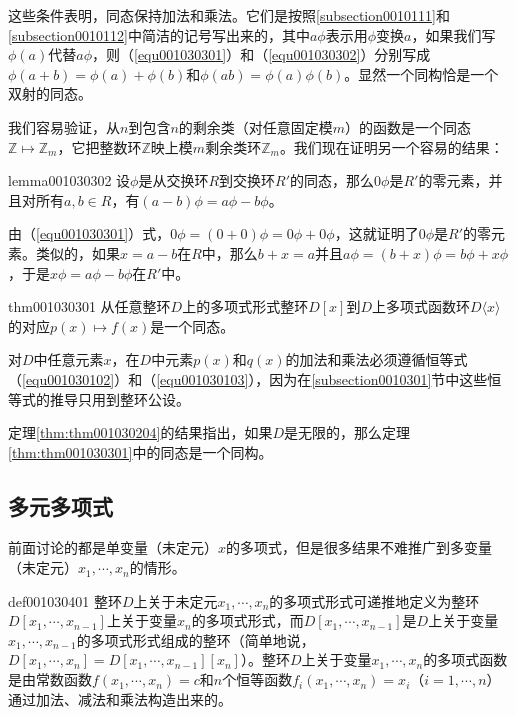 这些条件表明，同态保持加法和乘法。它们是按照\ref{subsection0010111}和\ref{subsection0010112}中简洁的记号写出来的，其中$a\phi$表示用$\phi$变换$a$，如果我们写$\phi(a)$代替$a\phi$，则（\ref{equ001030301}）和（\ref{equ001030302}）分别写成$\phi(a+b)=\phi(a)+\phi(b)$和$\phi(ab)=\phi(a)\phi(b)$。显然一个同构恰是一个双射的同态。

我们容易验证，从$n$到包含$n$的剩余类（对任意固定模$m$）的函数是一个同态$\mathbb{Z}\mapsto \mathbb{Z}_m$，它把整数环$\mathbb{Z}$映上模$m$剩余类环$\mathbb{Z}_m$。我们现在证明另一个容易的结果：
\begin{lemma}{}{lemma001030302}
设$\phi$是从交换环$R$到交换环$R'$的同态，那么$0\phi$是$R'$的零元素，并且对所有$a, b \in R$，有$(a-b)\phi = a\phi - b\phi$。
\end{lemma}

由（\ref{equ001030301}）式，$0\phi = (0+0)\phi = 0\phi + 0\phi$，这就证明了$0\phi$是$R'$的零元素。类似的，如果$x=a-b$在$R$中，那么$b+x=a$并且$a\phi = (b+x)\phi = b\phi+x\phi$，于是$x\phi = a\phi - b\phi$在$R'$中。

\begin{theorem}{}{thm001030301}
从任意整环$D$上的多项式形式整环$D[x]$到$D$上多项式函数环$D\langle{x}\rangle$的对应$p(x)\mapsto f(x)$是一个同态。
\end{theorem}

对$D$中任意元素$x$，在$D$中元素$p(x)$和$q(x)$的加法和乘法必须遵循恒等式（\ref{equ001030102}）和（\ref{equ001030103}），因为在\ref{subsection0010301}节中这些恒等式的推导只用到整环公设。

定理\ref{thm:thm001030204}的结果指出，如果$D$是无限的，那么定理\ref{thm:thm001030301}中的同态是一个同构。


\subsection{多元多项式}\label{subsection0010304}
前面讨论的都是单变量（未定元）$x$的多项式，但是很多结果不难推广到多变量（未定元）$x_1, \cdots, x_n$的情形。
\begin{definition}{}{def001030401}
整环$D$上关于未定元$x_1, \cdots, x_n$的多项式形式可递推地定义为整环$D[x_1,\cdots,x_{n-1}]$上关于变量$x_n$的多项式形式，而$D[x_1,\cdots,x_{n-1}]$是$D$上关于变量$x_1,\cdots, x_{n-1}$的多项式形式组成的整环（简单地说，$D[x_1,\cdots, x_n]=D[x_1, \cdots, x_{n-1}][x_n]$）。整环$D$上关于变量$x_1,\cdots, x_n$的多项式函数是由常数函数$f(x_1,\cdots,x_n)=c$和$n$个恒等函数$f_i(x_1,\cdots,x_n)=x_i$（$i=1,\cdots,n$）通过加法、减法和乘法构造出来的。
\end{definition}

